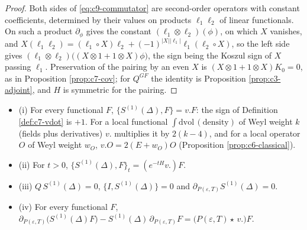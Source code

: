 \begin{proof}
Both sides of \eqref{eq:c9-commutator} are second-order operators with constant coefficients, determined by their values on products $\ell_1\ell_2$ of linear functionals. On such a product $\partial_\phi$ gives the constant $(\ell_1\otimes\ell_2)(\phi)$, on which $X$ vanishes, and $X(\ell_1\ell_2)=(\ell_1\circ X)\ell_2+(-1)^{|X||\ell_1|}\ell_1(\ell_2\circ X)$, so the left side gives $(\ell_1\otimes\ell_2)\big((X\otimes1+1\otimes X)\phi\big)$, the sign being the Koszul sign of $X$ passing $\ell_1$. Preservation of the pairing by an even $X$ is $(X\otimes1+1\otimes X)K_0=0$, as in Proposition \ref{prop:c7-cov}; for $Q^{GF}$ the identity is Proposition \ref{prop:c3-adjoint}, and $H$ is symmetric for the pairing.
\end{proof}

\begin{lemma}
\label{lem:c9-SDelta}
\begin{itemize}
\item (i) For every functional $F$, $\{S^{(1)}(\Delta),F\}=v.F$: the sign of Definition \ref{def:c7-vdot} is $+1$. For a local functional $\int\mathrm{dvol}\,(\text{density})$ of Weyl weight $k$ (fields plus derivatives) $v.$ multiplies it by $2(k-4)$, and for a local operator $O$ of Weyl weight $w_O$, $v.O=2(E+w_O)O$ (Proposition \ref{prop:c6-classical}).
\item (ii) For $t>0$, $\{S^{(1)}(\Delta),F\}_t=(e^{-tH}v.)F$.
\item (iii) $Q\,S^{(1)}(\Delta)=0$, $\{I,S^{(1)}(\Delta)\}=0$ and $\partial_{P(\varepsilon,T)}S^{(1)}(\Delta)=0$.
\item (iv) For every functional $F$, $\partial_{P(\varepsilon,T)}\big(S^{(1)}(\Delta)F\big)-S^{(1)}(\Delta)\,\partial_{P(\varepsilon,T)}F=\big(P(\varepsilon,T)\star\,v.\big)F$.
\end{itemize}
\end{lemma}

